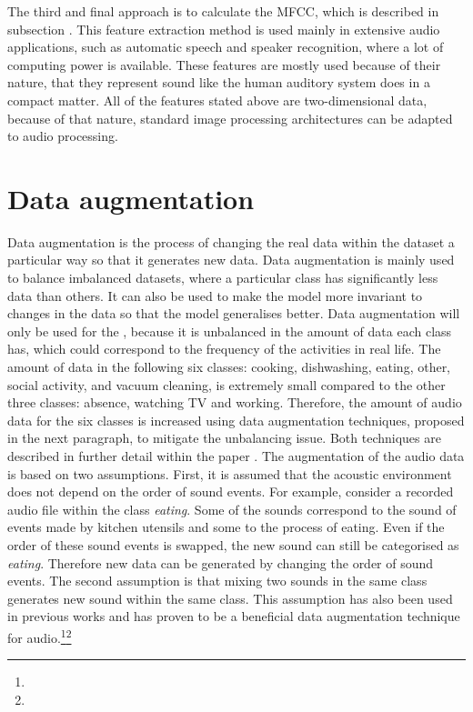 \newline
\newline
The third and final approach is to calculate the \gls{MFCC}, which is described in subsection . This feature extraction method is used mainly in extensive audio applications, such as automatic speech and speaker recognition, where a lot of computing power is available. These features are mostly used because of their nature, that they represent sound like the human auditory system does in a compact matter.
\newline
\newline
All of the features stated above are two-dimensional data, because of that nature, standard image processing architectures can be adapted to audio processing.

\section{Data augmentation}
\label{sec:Data-Augmentation}
Data augmentation is the process of changing the real data within the dataset a particular way so that it generates new data. Data augmentation is mainly used to balance imbalanced datasets, where a particular class has significantly less data than others. It can also be used to make the model more invariant to changes in the data so that the model generalises better.
\newline
\newline
Data augmentation will only be used for the , because it is unbalanced in the amount of data each class has, which could correspond to the frequency of the activities in real life. The amount of data in the following six classes: cooking, dishwashing, eating, other, social activity, and vacuum cleaning, is extremely small compared to the other three classes: absence, watching TV and working. Therefore, the amount of audio data for the six classes is increased using data augmentation techniques, proposed in the next paragraph, to mitigate the unbalancing issue. Both techniques are described in further detail within the paper \cite{inoue_domestic_2018}. %
\newline
\newline
The augmentation of the audio data is based on two assumptions. First, it is assumed that the acoustic environment does not depend on the order of sound events. For example, consider a recorded audio file within the class \textit{eating}. Some of the sounds correspond to the sound of events made by kitchen utensils and some to the process of eating. Even if the order of these sound events is swapped, the new sound can still be categorised as \textit{eating}. Therefore new data can be generated by changing the order of sound events. The second assumption is that mixing two sounds in the same class generates new sound within the same class. This assumption has also been used in previous works and has proven to be a beneficial data augmentation technique for audio.\footnote{}\footnote{}
